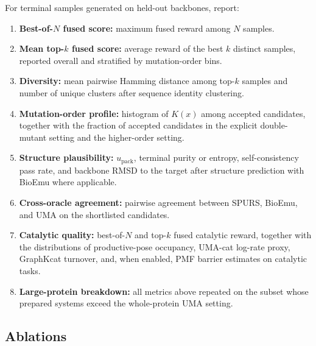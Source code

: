 \documentclass[11pt]{article}
\newcommand{\packunc}{\ensuremath{u_{\mathrm{pack}}}}
\begin{document}
	For terminal samples generated on held-out backbones, report:
	\begin{enumerate}[leftmargin=1.5em]
		\item \textbf{Best-of-$N$ fused score:} maximum fused reward among $N$ samples.
		\item \textbf{Mean top-$k$ fused score:} average reward of the best $k$ distinct samples, reported overall and stratified by mutation-order bins.
		\item \textbf{Diversity:} mean pairwise Hamming distance among top-$k$ samples and number of unique clusters after sequence identity clustering.
		\item \textbf{Mutation-order profile:} histogram of $K(x)$ among accepted candidates, together with the fraction of accepted candidates in the explicit double-mutant setting and the higher-order setting.
		\item \textbf{Structure plausibility:} \packunc, terminal purity or entropy, self-consistency pass rate, and backbone RMSD to the target after structure prediction with BioEmu where applicable.
		\item \textbf{Cross-oracle agreement:} pairwise agreement between SPURS, BioEmu, and UMA on the shortlisted candidates.
		\item \textbf{Catalytic quality:} best-of-$N$ and top-$k$ fused catalytic reward, together with the distributions of productive-pose occupancy, UMA-cat log-rate proxy, GraphKcat turnover, and, when enabled, PMF barrier estimates on catalytic tasks.
		\item \textbf{Large-protein breakdown:} all metrics above repeated on the subset whose prepared systems exceed the whole-protein UMA setting.
	\end{enumerate}
	
	
	\subsection{Ablations}
	
\end{document}
